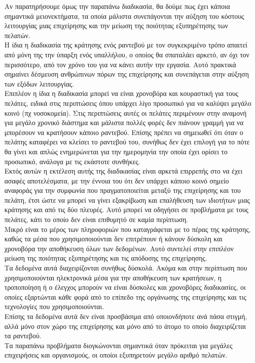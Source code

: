 \documentclass[12pt]{article}
\begin{document}
Αν παρατηρήσουμε όμως την παραπάνω διαδικασία, θα δούμε πως έχει κάποια σημαντικά μειονεκτήματα, τα οποία μάλιστα συνεπάγονται την αύξηση του κόστους λειτουργίας μιας επιχείρησης και την μείωση της ποιότητας εξυπηρέτησης των πελατών. 
\\[0.3cm]
Η  ίδια η διαδικασία της κράτησης ενός ραντεβού με τον συγκεκριμένο τρόπο απαιτεί από μόνη της την ύπαρξη ενός υπαλλήλου, ο οποίος θα σπαταλάει αρκετό, αν όχι τον περισσότερο, από τον χρόνο του για να κάνει αυτήν την εργασία. Αυτό πρακτικά σημαίνει δέσμευση ανθρώπινων πόρων της επιχείρησης και συνεπάγεται στην αύξηση των εξόδων λειτουργίας. 
\\[0.3cm]
Επιπλέον η ίδια η διαδικασία μπορεί να είναι χρονοβόρα και κουραστική για τους πελάτες, ειδικά στις περιπτώσεις όπου υπάρχει λίγο προσωπικό για να καλύψει μεγάλο κοινό (πχ νοσοκομεία). Στις περιπτώσεις αυτές οι πελάτες περιμένουν στην αναμονή για μεγάλο χρονικό διάστημα και μάλιστα πολλές φορές δεν πιάνουν γραμμή για να μπορέσουν να κρατήσουν κάποιο ραντεβού. Επίσης πρέπει να σημειωθεί ότι όταν ο πελάτης καταφέρει να κλείσει το ραντεβού του, συνήθως δεν έχει επιλογή για το πότε θα γίνει και απλώς ενημερώνεται για την ημερομηνία την οποία έχει ορίσει το προσωπικό, ανάλογα με τις εκάστοτε συνθήκες.  
\\[0.3cm]
Εκτός αυτών η εκτέλεση αυτής της διαδικασίας είναι αρκετά επιρρεπής στο να έχει ασαφές αποτελέσματα, με την έννοια του ότι δεν υπάρχει κάποιο κοινό σημείο αναφοράς για την συμφωνία που πραγματοποιείται μεταξύ της επιχείρησης και του πελάτη, έτσι ώστε να μπορεί να γίνει εξακρίβωση και επαλήθευση των ιδιοτήτων μιας κράτησης και από τις δύο πλευρές. Αυτό μπορεί να οδηγήσει σε προβλήματα με τους πελάτες, κάτι το οποίο δεν είναι επιθυμητό σε καμία περίπτωση.
\\[0.3cm]
Μικρό είναι το μέρος των πληροφοριών που καταγράφεται με το πέρας της κράτησης, καθώς τα μέσα που χρησιμοποιούνται δεν επιτρέπουν ή κάνουν δύσκολη και χρονοβόρα την αποθήκευση όλων των δεδομένων. Αυτό συντελεί στην επιπλέον μείωση της ποιότητας εξυπηρέτησης και τις απόδοσης της επιχείρησης.
\\[0.3cm]
Τα δεδομένα αυτά διαχειρίζονται συνήθως δύσκολά. Ακόμα και στην περίπτωση που χρησιμοποιούνται ηλεκτρονικά μέσα για την αποθήκευση των κρατήσεων, η τροποποίηση ή ο έλεγχος μπορούν να είναι δύσκολες και χρονοβόρες διαδικασίες, οι οποίες εξαρτώνται κάθε φορά από το επίπεδο της οργάνωσης της επιχείρησης και τις τεχνολογίες που χρησιμοποιούνται. 
\\[0.3cm]
Επίσης τα δεδομένα αυτά δεν είναι προσβάσιμα από οποιονδήποτε ανά πάσα στιγμή, αλλά μόνο στον χώρο της επιχείρησης και μόνο από το άτομο το οποίο διαχειρίζεται τα ραντεβού. 
\\[0.3cm]
Τα παραπάνω προβλήματα διογκώνονται σημαντικά όταν πρόκειται για μεγάλες επιχειρήσεις και οργανισμούς, οι οποίοι εξυπηρετούν μεγάλο αριθμό πελατών.
\end{document}

